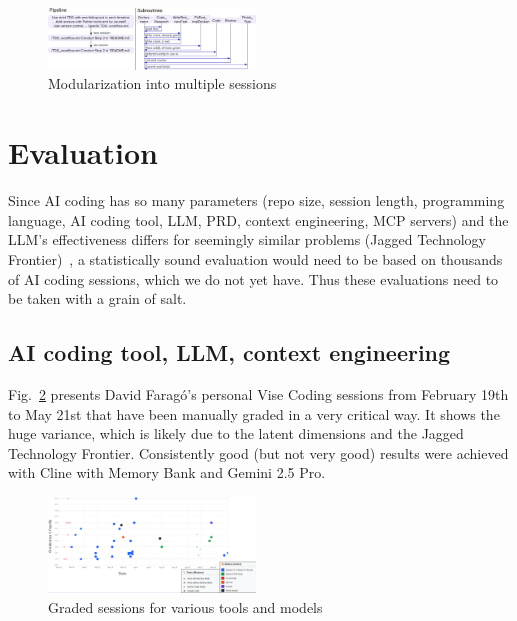 \documentclass[twocolumn,german]{article}
\begin{document}
\begin{figure}[hbt!]
  \vspace{-2mm}
  \hspace{-3mm}
  \includegraphics[width=0.49\textwidth]{figures/pipeline_vs_subtask_v3}
  \vspace{-8mm}
\caption{Modularization into multiple sessions}
\label{fig:pipelinesubtask}
\end{figure}

\section{Evaluation}

Since AI coding has so many parameters (repo size, session length, programming language, AI coding tool, LLM,
PRD, context engineering, MCP servers)
and the LLM's effectiveness differs for seemingly similar problems (Jagged Technology Frontier)~\cite{FD23},
a statistically sound evaluation would need to be based on thousands of AI coding sessions, which we do not yet have.
Thus these evaluations need to be taken with a grain of salt.

\subsection{AI coding tool, LLM, context engineering}
\label{sec:gradedsessions}

Fig.~\ref{fig:toolsmodels} presents David Farag\'{o}'s personal Vise Coding sessions from February 19th to May 21st that have been manually graded in a very critical way.
It shows the huge variance, which is likely due to the latent dimensions and the Jagged Technology Frontier.
Consistently good (but not very good) results were achieved with Cline with Memory Bank and Gemini 2.5 Pro.

\begin{figure}[hbt!]
    \vspace{-1mm}
    \hspace{-3mm}
  \includegraphics[width=0.49\textwidth]{figures/tools_models_v1}
  \vspace{-7mm}
\caption{Graded sessions for various tools and models}
\label{fig:toolsmodels}
\end{figure}
\end{document}
